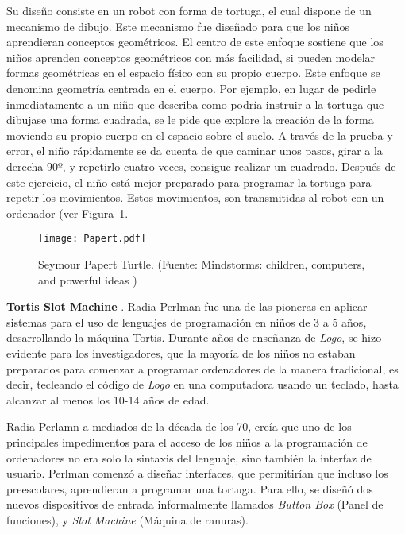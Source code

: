 Su diseño consiste en un robot con forma de tortuga, el cual dispone de un mecanismo de dibujo. Este mecanismo fue diseñado para que los niños aprendieran conceptos geométricos. 
El centro de este enfoque sostiene que los niños aprenden conceptos geométricos con más facilidad, si pueden modelar formas geométricas en el espacio físico con su propio cuerpo. Este enfoque se denomina geometría centrada en el cuerpo. Por ejemplo, en lugar de pedirle inmediatamente a un niño que describa como podría instruir a la tortuga que dibujase una forma cuadrada, se le pide que explore la creación de la forma moviendo su propio cuerpo en el espacio sobre el suelo. A través de la prueba y error, el niño rápidamente se da cuenta de que caminar unos pasos, girar a la derecha 90º, y repetirlo cuatro veces, consigue realizar un cuadrado. Después de este ejercicio, el niño está mejor preparado para programar la tortuga para repetir los movimientos. Estos movimientos, son transmitidas al robot con un ordenador (ver Figura~\ref{fig:Papert}.


\begin{figure}[!h]
\begin{center}
\texttt{[image: Papert.pdf]}
\caption{Seymour Papert Turtle. (Fuente: Mindstorms: children, computers, and powerful ideas \cite{Papert})}
\label{fig:Papert}
\end{center}
\end{figure}

\textbf{Tortis Slot Machine} \cite{Perlman}. 
Radia Perlman fue una de las pioneras en aplicar sistemas para el uso de lenguajes de programación en niños de 3 a 5 años, desarrollando la máquina Tortis. Durante años de enseñanza de \emph{Logo}, se hizo evidente para los investigadores, que la mayoría de los niños no estaban preparados para comenzar a programar ordenadores de la manera tradicional, es decir, tecleando el código de \emph{Logo} en una computadora usando un teclado, hasta alcanzar al menos los 10-14 años de edad. 

Radia Perlamn a mediados de la década de los 70, creía que uno de los principales impedimentos para el acceso de los niños a la programación de ordenadores no era solo la sintaxis del lenguaje, sino también la interfaz de usuario. Perlman comenzó a diseñar interfaces, que permitirían que incluso los preescolares, aprendieran a programar una tortuga. Para ello, se diseñó dos nuevos dispositivos de entrada informalmente llamados \textit{Button Box} (Panel de funciones), y \textit{Slot Machine} (Máquina de ranuras). 

